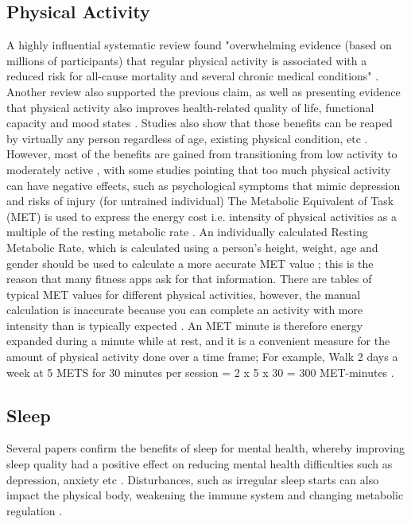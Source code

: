 \subsection{Physical Activity}
A highly influential systematic review found "overwhelming evidence (based on millions of participants) that regular physical activity is associated with a reduced risk for all-cause mortality and several chronic medical conditions" \cite{Warburton2017Health}. Another review also supported the previous claim, as well as presenting evidence that physical activity also improves health-related quality of life, functional capacity and mood states \cite{Penedo2005Exercise}. Studies also show that those benefits can be reaped by virtually any person regardless of age, existing physical condition, etc \cite{Penedo2005Exercise, Warburton2017Health}. However, most of the benefits are gained from transitioning from low activity to moderately active \cite{Powell2011Physical}, with some studies pointing that too much physical activity can have negative effects, such as psychological symptoms that mimic depression \cite{Paluska2000Physical} and risks of injury (for untrained individual) \cite{Melzer2004Physical}
The Metabolic Equivalent of Task (MET) is used to express the energy cost i.e. intensity of physical activities as a multiple of the resting metabolic rate \cite{Jetté1990Metabolic}. An individually calculated Resting Metabolic Rate, which is calculated using a person's height, weight, age and gender should be used to calculate a more accurate MET value \cite{Byrne2005Metabolic}; this is the reason that many fitness apps ask for that information. There are tables of typical MET values for different physical activities, however, the manual calculation is inaccurate because you can complete an activity with more intensity than is typically expected \cite{Jetté1990Metabolic}. An MET minute is therefore energy expanded during a minute while at rest, and it is a convenient measure for the amount of physical activity done over a time frame; For example, Walk 2 days a week at 5 METS for 30 minutes per session = 2 x 5 x 30 = 300 MET-minutes \cite{metMinutes}.
\subsection{Sleep}
Several papers confirm the benefits of sleep for mental health, whereby improving sleep quality had a positive effect on reducing mental health difficulties such as depression, anxiety etc \cite{sleep1, sleep2, sleep3}. Disturbances, such as irregular sleep starts can also impact the physical body, weakening the immune system \cite{sleep4} and changing metabolic regulation \cite{sleep2}.

